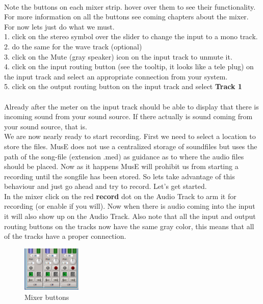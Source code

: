 \documentclass[a4paper]{report}
\begin{document}
\\
Note the buttons on each mixer strip. hover over them to see their 
functionality. For more information on all the buttons see coming chapters 
about the mixer. For now lets just do what we must.\\
1. click on the stereo symbol over the slider to change the input to a mono track.\\
2. do the same for the wave track (optional)\\
3. click on the Mute (gray speaker) icon on the input track to unmute it.\\
4. click on the input routing button (see the tooltip, it looks like a tele plug) 
on the input track and select an appropriate connection from your system.\\
5. click on the output routing button on the input track and select 
\textbf{Track 1}\\
\\
Already after the meter on the input track should be able to display that there
is incoming sound from your sound source. If there actually is sound coming 
from your sound source, that is.\\
We are now nearly ready to start recording. First we need to select a location
to store the files. MusE does not use a centralized storage of soundfiles but
uses the path of the song-file (extension .med) as guidance as to where the
audio files should be placed. Now as it happens MusE will prohibit us from
starting a recording until the songfile has been stored. So lets take advantage
of this behaviour and just go ahead and try to record. Let's get started.\\
In the mixer click on the red \textbf{record} dot on the Audio Track to arm it
for recording (or enable if you will). Now when there is audio coming into the
input it will also show up on the Audio Track. Also note that all the input and
output routing buttons on the tracks now have the same gray color, this means
that all of the tracks have a proper connection.
\begin{figure}[htp]
\centering \includegraphics[width=0.25\textwidth]{pics/mixer_with_one_input_buttons} 
\caption{Mixer buttons}
\label{fig:Mixer buttons}
\end{figure}
\end{document}
